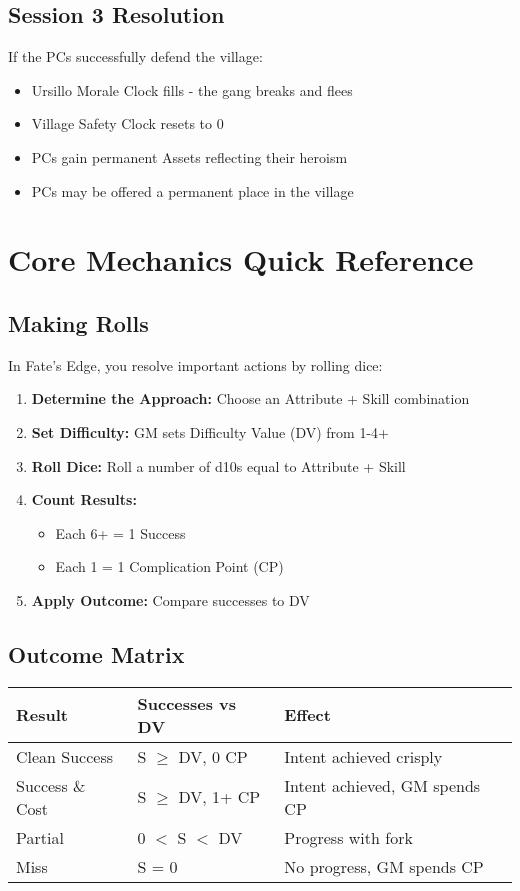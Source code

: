 \documentclass[11pt]{article}
\begin{document}
\subsection{Session 3 Resolution}

If the PCs successfully defend the village:
\begin{itemize}
\item Ursillo Morale Clock fills - the gang breaks and flees
\item Village Safety Clock resets to 0
\item PCs gain permanent Assets reflecting their heroism
\item PCs may be offered a permanent place in the village
\end{itemize}

\section{Core Mechanics Quick Reference}

\subsection{Making Rolls}

In Fate's Edge, you resolve important actions by rolling dice:
\begin{enumerate}
\item \textbf{Determine the Approach:} Choose an Attribute + Skill combination
\item \textbf{Set Difficulty:} GM sets Difficulty Value (DV) from 1-4+
\item \textbf{Roll Dice:} Roll a number of d10s equal to Attribute + Skill
\item \textbf{Count Results:}
   \begin{itemize}
   \item Each 6+ = 1 Success
   \item Each 1 = 1 Complication Point (CP)
   \end{itemize}
\item \textbf{Apply Outcome:} Compare successes to DV
\end{enumerate}

\subsection{Outcome Matrix}

\begin{center}
\begin{tabular}{|l|l|l|}
\hline
\textbf{Result} & \textbf{Successes vs DV} & \textbf{Effect} \\
\hline
Clean Success & S $\geq$ DV, 0 CP & Intent achieved crisply \\
Success \& Cost & S $\geq$ DV, 1+ CP & Intent achieved, GM spends CP \\
Partial & 0 $<$ S $<$ DV & Progress with fork \\
Miss & S = 0 & No progress, GM spends CP \\
\hline
\end{tabular}
\end{center}
\end{document}
